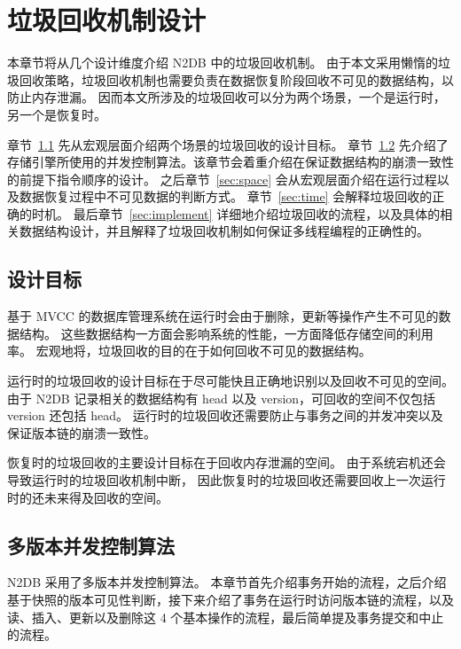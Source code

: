 
\chapter{垃圾回收机制设计}

本章节将从几个设计维度介绍 N2DB 中的垃圾回收机制。
由于本文采用懒惰的垃圾回收策略，垃圾回收机制也需要负责在数据恢复阶段回收不可见的数据结构，以防止内存泄漏。
因而本文所涉及的垃圾回收可以分为两个场景，一个是运行时，另一个是恢复时。

章节~\ref{sec:gc-goal} 先从宏观层面介绍两个场景的垃圾回收的设计目标。
章节~\ref{sec:mvcc} 先介绍了存储引擎所使用的并发控制算法。该章节会着重介绍在保证数据结构的崩溃一致性的前提下指令顺序的设计。
之后章节~\ref{sec:space} 会从宏观层面介绍在运行过程以及数据恢复过程中不可见数据的判断方式。
章节~\ref{sec:time} 会解释垃圾回收的正确的时机。
最后章节~\ref{sec:implement} 详细地介绍垃圾回收的流程，以及具体的相关数据结构设计，并且解释了垃圾回收机制如何保证多线程编程的正确性的。


\section{设计目标}
\label{sec:gc-goal}

基于 MVCC 的数据库管理系统在运行时会由于删除，更新等操作产生不可见的数据结构。
这些数据结构一方面会影响系统的性能，一方面降低存储空间的利用率。
宏观地将，垃圾回收的目的在于如何回收不可见的数据结构。

运行时的垃圾回收的设计目标在于尽可能快且正确地识别以及回收不可见的空间。
由于 N2DB 记录相关的数据结构有 head 以及 version，可回收的空间不仅包括 version 还包括 head。
运行时的垃圾回收还需要防止与事务之间的并发冲突以及保证版本链的崩溃一致性。

恢复时的垃圾回收的主要设计目标在于回收内存泄漏的空间。
由于系统宕机还会导致运行时的垃圾回收机制中断，
因此恢复时的垃圾回收还需要回收上一次运行时的还未来得及回收的空间。


\section{多版本并发控制算法}
\label{sec:mvcc}
N2DB 采用了多版本并发控制算法。
本章节首先介绍事务开始的流程，之后介绍基于快照的版本可见性判断，接下来介绍了事务在运行时访问版本链的流程，以及读、插入、更新以及删除这 4 个基本操作的流程，最后简单提及事务提交和中止的流程。

